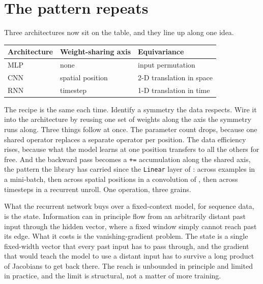 
\section{The pattern repeats}\label{sec:rnn-pattern}

Three architectures now sit on the table, and they line up along one idea.

\begin{center}
\begin{tabular}{@{}lll@{}}
\toprule
Architecture & Weight-sharing axis & Equivariance \\
\midrule
MLP & none & input permutation \\
CNN & spatial position & 2-D translation in space \\
RNN & timestep & 1-D translation in time \\
\bottomrule
\end{tabular}
\end{center}

The recipe is the same each time. Identify a symmetry the data respects.
Wire it into the architecture by reusing one set of weights along the axis
the symmetry runs along. Three things follow at once. The parameter count
drops, because one shared operator replaces a separate operator per
position. The data efficiency rises, because what the model learns at one
position transfers to all the others for free. And the backward pass becomes
a \texttt{+=} accumulation along the shared axis, the pattern the library has
carried since the \texttt{Linear} layer of : across
examples in a mini-batch, then across spatial positions in a convolution of
, then across timesteps in a recurrent unroll. One operation,
three grains.

What the recurrent network buys over a fixed-context model, for sequence
data, is the state. Information can in principle flow from an arbitrarily
distant past input through the hidden vector, where a fixed window simply
cannot reach past its edge. What it costs is the vanishing-gradient problem.
The state is a single fixed-width vector that every past input has to pass
through, and the gradient that would teach the model to use a distant input
has to survive a long product of Jacobians to get back there. The reach is
unbounded in principle and limited in practice, and the limit is structural,
not a matter of more training.

